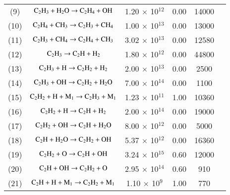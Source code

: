 \documentclass{warpdoc}
\begin{document}
\begin{table}[h]
\begin{center}
\begin{threeparttable}
\begin{tabular}{cccccc}
(9) & $\rm  C_2 H_3 + H_2 O \rightarrow C_2 H_4 + OH  $ & 1.20 $\times$ 10$^{12}$  & 0.00 & 14000 &\cite{caf:1989:refael}\\

(10) & $\rm  C_2 H_4 + C H_3 \rightarrow C_2 H_3 + C H_4  $ & 1.00 $\times$ 10$^{13}$  & 0.00 & 13000 &\cite{caf:1989:refael}\\

(11) & $\rm  C_2 H_3 + C H_4  \rightarrow C_2 H_4 + C H_3 $ & 3.02 $\times$ 10$^{13}$  & 0.00 & 12580 &\cite{caf:1989:refael}\\

(12) & $\rm  C_2 H_3  \rightarrow C_2 H +H_2 $ & 1.80 $\times$ 10$^{12}$  & 0.00 &44800 &\cite{ef:2017:zettervall}\\

(13) & $\rm  C_2 H_3 +H \rightarrow C_2 H_2 +H_2 $ & 2.00 $\times$ 10$^{13}$  & 0.00 &2500 &\cite{caf:1989:refael}\\

(14) & $\rm  C_2 H_3 +OH \rightarrow C_2 H_2 +H_2 O $ & 7.00 $\times$ 10$^{14}$  & 0.00 &1100 &\cite{ef:2017:zettervall}\\

(15) & $\rm  C_2 H_2 +H+M_1 \rightarrow C_2 H_3 +M_1 $ & 1.23 $\times$ 10$^{11}$  & 1.00 &10360 &\cite{caf:1989:refael}\tnote{a}\\

(16) & $\rm  C_2 H_2 +H\rightarrow C_2 H +H_2 $ & 2.00 $\times$ 10$^{14}$  & 0.00 &19000 &\cite{caf:1989:refael}\\

(17) & $\rm  C_2 H_2 +OH\rightarrow C_2 H +H_2 O $ &8.00 $\times$ 10$^{12}$  & 0.00 &5000 &\cite{caf:1989:refael}\\

(18) & $\rm  C_2 H +H_2 O\rightarrow C_2 H_2 + OH $ &5.37 $\times$ 10$^{12}$  & 0.00 &16360 &\cite{caf:1989:refael}\\

(19) & $\rm  C_2 H_2 + O\rightarrow C_2 H + OH $ &3.24 $\times$ 10$^{15}$  & 0.60 &12000 &\cite{caf:1989:refael}\\

(20) & $\rm  C_2 H + OH\rightarrow C_2 H_2 + O $ &2.95 $\times$ 10$^{14}$  & 0.60 &910 &\cite{caf:1989:refael}\\

(21) & $\rm  C_2 H + H + M_1 \rightarrow C_2 H_2 + M_1 $ &1.10 $\times$ 10$^{9}$  & 1.00 &770 &\cite{caf:1989:refael}\tnote{a}\\


\end{tabular}
\end{threeparttable}
\end{center}
\end{table}
\end{document}
